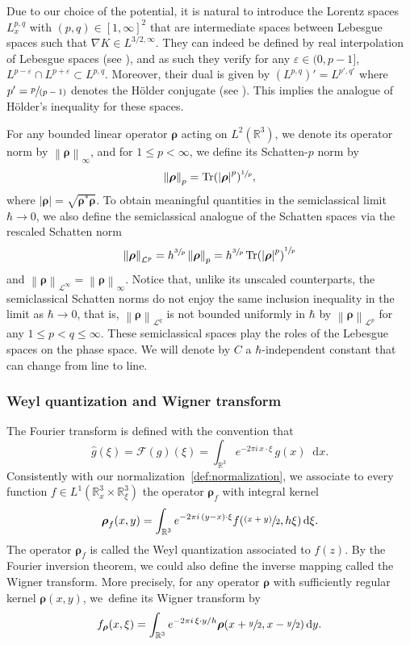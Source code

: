 \documentclass[10pt]{amsart}
\newcommand{\spfrac}[2]{\sfrac{#1}{(#2)}}
\newcommand{\psfrac}[2]{\sfrac{(#1)}{#2}}
\newcommand {\aTr}[1] {\tr(#1)}
\theoremstyle{definition}
\newcommand {\RR} {\mathbb R}
\newcommand {\Rd} {\RR^3}
\renewcommand {\L} {\mathcal L}
\newcommand {\cL} {\mathcal L}
\newcommand {\ecF} {\mathscr{F}}
\let\lt\left
\let\rt\right
\renewcommand {\(} {\lt(}
\renewcommand {\)} {\rt)}
\newcommand {\n}[1] {\lt\lvert #1 \rt\rvert}
\newcommand {\nrm}[1] {\lt\lVert #1\rt\rVert}
\newcommand {\Nrm}[2] {\nrm{#1}_{#2}}
\let\eps\varepsilon
\renewcommand {\d} {\mathop{}\!\mathrm{d}}
\DeclareMathOperator{\tr} {Tr}
\newcommand {\F}[1] {\ecF\!\( #1 \)}
\newcommand {\Tr}[1] {\tr\!\( #1 \)}
\newcommand {\intd} {\int_{\Rd}}
\newcommand {\op} {\boldsymbol{\rho}}
\begin{document}
Due to our choice of the potential, it is natural to introduce the Lorentz spaces $L^{p,q}_x$ with $(p,q)\in[1,\infty]^2$ that are intermediate spaces between Lebesgue spaces such that $\nabla K \in L^{3/2,\infty}$. They can indeed be defined by real interpolation of Lebesgue spaces (see \eg \cite[Th.\,5.3.1]{bergh_interpolation_1976}), and as such they verify for any $\eps\in(0,p-1]$, $L^{p-\eps} \cap L^{p+\eps} \subset L^{p,q}$. Moreover, their dual is given by $(L^{p,q})' = L^{p',q'}$ where $p' = \spfrac{p}{p-1}$ denotes the Hölder conjugate (see \eg \cite{hunt_lpq_1966}). This implies the analogue of Hölder's inequality for these spaces.

For any bounded linear operator $\op$ acting on $L^2(\Rd)$, we denote its operator norm by $\Nrm{\op}{\infty}$, and for $1\le p < \infty$, we define its Schatten-$p$ norm by
\begin{equation*}
\Nrm{\op}{p}= \aTr{\n{\op}^p}^{\sfrac1p},
\end{equation*}
where $\n{\op} = \sqrt{\op^\ast \op}$. To obtain meaningful quantities in the semiclassical limit \hbox{$\hbar\to 0$}, we also define the semiclassical analogue of the Schatten spaces via the rescaled Schatten norm
\begin{equation*}
\Nrm{\op}{\L^p} = h^{\sfrac3p} \Nrm{\op}{p}= h^{\sfrac3p}\Tr{\n{\op}^p}^{\sfrac1p}
\end{equation*}
and $\Nrm{\op}{\cL^\infty}=\Nrm{\op}{\infty}$. Notice that, unlike its unscaled counterparts, the semiclassical Schatten norms do not enjoy the same inclusion inequality in the limit as $\hbar\to 0$, that is, $\Nrm{\op}{\cL^q}$ is not bounded uniformly in $\hbar$ by $\Nrm{\op}{\cL^p}$ for any $1\le p< q\le \infty$. These semiclassical spaces play the roles of the Lebesgue spaces on the phase space. We will denote by $C$ a $\hbar$-independent constant that can change from line to line.

\subsubsection{Weyl quantization and Wigner transform} The Fourier transform is defined with the convention that
\begin{equation*}
\widehat g(\xi) = {\F{g}(\xi) =} \intd e^{-2\pi i\, x\cdot \xi}\,g(x)\d x.
\end{equation*}
Consistently with our normalization~\eqref{def:normalization}, we associate to every function \hbox{$f \!\in\! L^1(\Rd_x\!\times\!\Rd_{\xi})$} the operator $\op_f$ with integral kernel
\begin{equation*}
\op_f(x, y) = \intd e^{-2\pi i\, (y-x)\cdot \xi} f(\psfrac{x+y}{2}, h\xi)\d \xi.
\end{equation*}
The operator $\op_f$ is called the Weyl quantization associated to $f(z)$. By the Fourier inversion theorem, we could also define the inverse mapping called the Wigner transform. More precisely, for any operator $\op$ with sufficiently regular kernel $\op(x, y)$, we~define its Wigner transform by
\begin{equation*}
f_{\op}(x, \xi) = \intd e^{-2\pi i\, \xi\cdot y/h} \op(x+\sfrac{y}{2}, x-\sfrac{y}{2})\d y.
\end{equation*}
\end{document}
